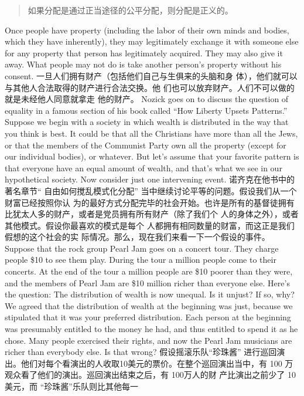 \begin{paracol}{2}
\begin{quotation}
	
	如果分配是通过正当途径的公平分配，则分配是正义的。
\end{quotation}
\switchcolumn*
Once people have property (including the labor of their own
minds and bodies, which they have inherently), they may legitimately exchange it with someone else for any property that
person has legitimately acquired. They may also give it away.
What people may not do is take another person's property without his consent.
\switchcolumn
一旦人们拥有财产（包括他们自己与生俱来的头脑和身
体），他们就可以与其他人合法取得的财产进行合法交换。他
们也可以放弃财产。人们不可以做的就是未经他人同意就拿走
他的财产。
\switchcolumn*
Nozick goes on to discuss the question of equality in a famous section of his book called ``How Liberty Upsets Patterns.''
Suppose we begin with a society in which wealth is distributed
in the way that you think is best. It could be that all the Christians have more than all the Jews, or that the members of the
Communist Party own all the property (except for our individual bodies), or whatever. But let's assume that your favorite
pattern is that everyone have an equal amount of wealth, and
that's what we see in our hypothetical society. Now consider
just one intervening event.
\switchcolumn
诺齐克在他书中的著名章节“ 自由如何搅乱模式化分配”
当中继续讨论平等的问题。假设我们从一个财富已经按照你认
为的最好方式分配完毕的社会开始。也许是所有的基督徒拥有
比犹太人多的财产，或者是党员拥有所有财产（除了我们个
人的身体之外），或者其他模式。假设你最喜欢的模式是每个
人都拥有相同数量的财富，而这正是我们假想的这个社会的实
际情况。那么，现在我们来看一下一个假设的事件。
\switchcolumn*
Suppose that the rock group Pearl Jam goes on a concert
tour. They charge people \$10 to see them play. During the tour
a million people come to their concerts. At the end of the tour a
million people are \$10 poorer than they were, and the members
of Pearl Jam are \$10 million richer than everyone else. Here's
the question: The distribution of wealth is now unequal. Is it
unjust? If so, why? We agreed that the distribution of wealth at
the beginning was just, because we stipulated that it was your
preferred distribution. Each person at the beginning was presumably entitled to the money he had, and thus entitled to
spend it as he chose. Many people exercised their rights, and
now the Pearl Jam musicians are richer than everybody else. Is
that wrong?
\switchcolumn
假设摇滚乐队“珍珠酱” 进行巡回演出。他们对每个看演出的人收取10美元的票价。在整个巡回演出当中，有 100
万观众看了他们的演出。巡回演出结束之后，有 100万人的财
产比演出之前少了 10美元，而 “珍珠酱”乐队则比其他每一

\end{paracol}
